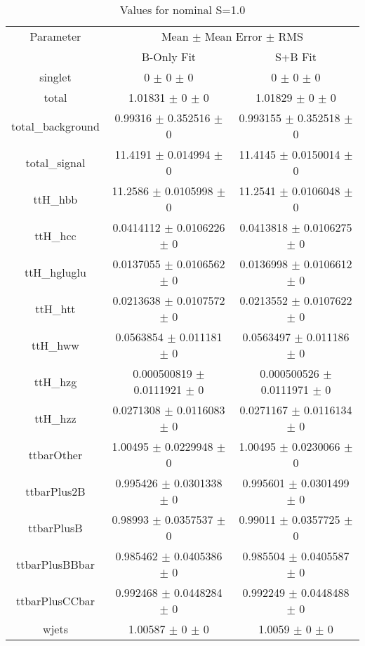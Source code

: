 \begin{table}
\centering
\caption{Values for nominal S=1.0}
\begin{tabular}{ccc}
\toprule
Parameter & \multicolumn{2}{c}{Mean $\pm$ Mean Error $\pm$ RMS}\\
 & B-Only Fit & S+B Fit\\
\midrule
singlet & \num{0} $\pm$ \num{0} $\pm$ \num{0} & \num{0} $\pm$ \num{0} $\pm$ \num{0}\\
total & \num{1.01831} $\pm$ \num{0} $\pm$ \num{0} & \num{1.01829} $\pm$ \num{0} $\pm$ \num{0}\\
total\_background & \num{0.99316} $\pm$ \num{0.352516} $\pm$ \num{0} & \num{0.993155} $\pm$ \num{0.352518} $\pm$ \num{0}\\
total\_signal & \num{11.4191} $\pm$ \num{0.014994} $\pm$ \num{0} & \num{11.4145} $\pm$ \num{0.0150014} $\pm$ \num{0}\\
ttH\_hbb & \num{11.2586} $\pm$ \num{0.0105998} $\pm$ \num{0} & \num{11.2541} $\pm$ \num{0.0106048} $\pm$ \num{0}\\
ttH\_hcc & \num{0.0414112} $\pm$ \num{0.0106226} $\pm$ \num{0} & \num{0.0413818} $\pm$ \num{0.0106275} $\pm$ \num{0}\\
ttH\_hgluglu & \num{0.0137055} $\pm$ \num{0.0106562} $\pm$ \num{0} & \num{0.0136998} $\pm$ \num{0.0106612} $\pm$ \num{0}\\
ttH\_htt & \num{0.0213638} $\pm$ \num{0.0107572} $\pm$ \num{0} & \num{0.0213552} $\pm$ \num{0.0107622} $\pm$ \num{0}\\
ttH\_hww & \num{0.0563854} $\pm$ \num{0.011181} $\pm$ \num{0} & \num{0.0563497} $\pm$ \num{0.011186} $\pm$ \num{0}\\
ttH\_hzg & \num{0.000500819} $\pm$ \num{0.0111921} $\pm$ \num{0} & \num{0.000500526} $\pm$ \num{0.0111971} $\pm$ \num{0}\\
ttH\_hzz & \num{0.0271308} $\pm$ \num{0.0116083} $\pm$ \num{0} & \num{0.0271167} $\pm$ \num{0.0116134} $\pm$ \num{0}\\
ttbarOther & \num{1.00495} $\pm$ \num{0.0229948} $\pm$ \num{0} & \num{1.00495} $\pm$ \num{0.0230066} $\pm$ \num{0}\\
ttbarPlus2B & \num{0.995426} $\pm$ \num{0.0301338} $\pm$ \num{0} & \num{0.995601} $\pm$ \num{0.0301499} $\pm$ \num{0}\\
ttbarPlusB & \num{0.98993} $\pm$ \num{0.0357537} $\pm$ \num{0} & \num{0.99011} $\pm$ \num{0.0357725} $\pm$ \num{0}\\
ttbarPlusBBbar & \num{0.985462} $\pm$ \num{0.0405386} $\pm$ \num{0} & \num{0.985504} $\pm$ \num{0.0405587} $\pm$ \num{0}\\
ttbarPlusCCbar & \num{0.992468} $\pm$ \num{0.0448284} $\pm$ \num{0} & \num{0.992249} $\pm$ \num{0.0448488} $\pm$ \num{0}\\
wjets & \num{1.00587} $\pm$ \num{0} $\pm$ \num{0} & \num{1.0059} $\pm$ \num{0} $\pm$ \num{0}\\
\bottomrule
\end{tabular}
\end{table}